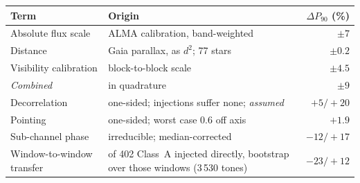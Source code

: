 \begin{tabular}{@{}l@{~}>{\raggedright\arraybackslash}p{}@{~}r@{}}
\hline
Term & Origin & $\Delta P_{90}$ (\%) \\
\hline
Absolute flux scale & ALMA calibration, band-weighted & $\pm7$ \\
Distance & Gaia parallax, as $d^{2}$; 77 stars & $\pm0.2$ \\
Visibility calibration & block-to-block scale & $\pm4.5$ \\
\hline
\emph{Combined} & in quadrature & $\pm9$ \\
\hline
Decorrelation & one-sided; injections suffer none; \emph{assumed} & $+5/+20$ \\
Pointing & one-sided; worst case 0.6\arcsec{} off axis & $+1.9$ \\
Sub-channel phase & irreducible; median-corrected & $-12/+17$ \\
Window-to-window transfer & 21 of 402 Class~A injected directly, bootstrap over those windows (3\,530 tones) & $-23/+12$ \\
\hline
\end{tabular}
